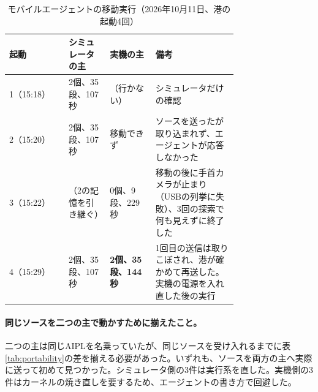 \documentclass[10pt,letterpaper]{article}
\begin{document}
\begin{table}[h]
\centering\small
\caption{モバイルエージェントの移動実行（2026年10月11日、港の起動4回）}
\label{tab:mobile}
\begin{tabular}{lp{0.18\linewidth}p{0.2\linewidth}p{0.36\linewidth}}
\toprule
起動 & シミュレータの主 & 実機の主 & 備考 \\
\midrule
1（15:18） & 2個、35段、107秒 & （行かない） & シミュレータだけの確認 \\
2（15:20） & 2個、35段、107秒 & 移動できず & ソースを送ったが取り込まれず、エージェントが応答しなかった \\
3（15:22） & （2の記憶を引き継ぐ） & 0個、9段、229秒 & 移動の後に手首カメラが止まり（USBの列挙に失敗）、3回の探索で何も見えずに終了した \\
4（15:29） & 2個、35段、107秒 & \textbf{2個、35段、144秒} & 1回目の送信は取りこぼされ、港が確かめて再送した。実機の電源を入れ直した後の実行 \\
\bottomrule
\end{tabular}
\end{table}

\paragraph{同じソースを二つの主で動かすために揃えたこと。}二つの主は同じAIPLを名乗っていたが、同じソースを受け入れるまでに表\ref{tab:portability}の差を揃える必要があった。いずれも、ソースを両方の主へ実際に送って初めて見つかった。シミュレータ側の3件は実行系を直した。実機側の3件はカーネルの焼き直しを要するため、エージェントの書き方で回避した。
\end{document}

